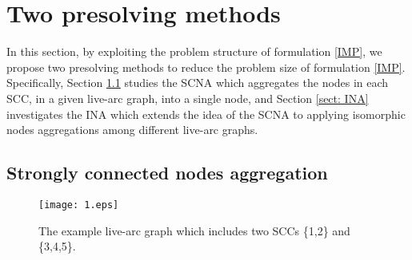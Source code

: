 \documentclass[a4paper,10pt]{article}
\theoremstyle{plain}
\newcommand{\revv}[1]{{#1}}
\begin{document}
	
	
	\section{Two presolving methods}\label{sect:presolving}
	In this section, by exploiting the problem structure of formulation \eqref{IMP}, we propose two presolving methods to reduce the problem size of formulation \eqref{IMP}.
	Specifically, \revv{Section} \ref{sect: SCNA} studies the SCNA which aggregates the nodes in each SCC, in a given live-arc graph, into a single node, and \revv{Section} \ref{sect: INA} investigates the INA which extends the idea of the SCNA to applying isomorphic nodes aggregations among different live-arc graphs.
	
	
	
	
	
	
	
	
	
	
	\subsection{Strongly connected nodes aggregation}\label{sect: SCNA}
	\begin{figure}[H]
		\centering
		\texttt{[image: 1.eps]}
		\caption{The example live-arc graph which includes two SCCs \{1,2\} and \{3,4,5\}.}
		\label{fig:SCNATikz1}
	\end{figure}
	
\end{document}
